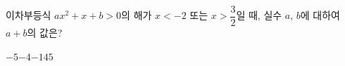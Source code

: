 이차부등식 $ax^2+x+b>0$의 해가 $x<-2$ 또는 $x>\dfrac{3}{2}$일 때, 실수 $a$, $b$에 대하여 $a+b$의 값은?
\begin{choices32}{$-5$}{$-4$}{$-1$}{$4$}{$5$}\end{choices32}
